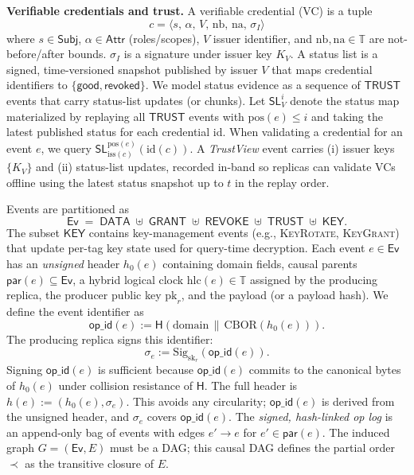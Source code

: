 \documentclass[10pt,journal,compsoc]{IEEEtran}
\begin{document}
\medskip
\noindent\textbf{Verifiable credentials and trust.}
A verifiable credential (VC) is a tuple
\[
  c = \langle s,\, \alpha,\, V,\, \mathrm{nb},\, \mathrm{na},\, \sigma_I\rangle
\]
where $s\!\in\!\mathsf{Subj}$, $\alpha\!\in\!\mathsf{Attr}$ (roles/scopes), $V$ issuer identifier,
and $\mathrm{nb},\mathrm{na}\!\in\!\mathbb{T}$ are not-before/after bounds.
$\sigma_I$ is a signature under issuer key $K_V$.
A status list is a signed, time-versioned snapshot published by issuer $V$ that maps credential identifiers to $\{\mathsf{good},\mathsf{revoked}\}$.
We model status evidence as a sequence of $\mathsf{TRUST}$ events that carry status-list updates (or chunks).
Let $\mathsf{SL}^{i}_{V}$ denote the status map materialized by replaying all $\mathsf{TRUST}$ events with $\mathrm{pos}(e) \le i$ and taking the latest published status for each credential id.
When validating a credential for an event $e$, we query $\mathsf{SL}^{\mathrm{pos}(e)}_{\mathrm{iss}(c)}(\mathrm{id}(c))$.
A \emph{TrustView} event carries (i) issuer keys $\{K_V\}$ and (ii) status-list updates, recorded in-band so replicas can validate VCs offline using the latest status snapshot up to $t$ in the replay order.

\medskip

Events are partitioned as
\[
  \mathsf{Ev} \;=\; \mathsf{DATA}\;\uplus\;\mathsf{GRANT}\;\uplus\;\mathsf{REVOKE}\;\uplus\;\mathsf{TRUST}\;\uplus\;\mathsf{KEY}.
\]
The subset $\mathsf{KEY}$ contains key-management events (e.g., \textsc{KeyRotate}, \textsc{KeyGrant}) that update per-tag key state used for query-time decryption.
Each event $e\in\mathsf{Ev}$ has an \emph{unsigned} header $h_0(e)$ containing domain fields, causal parents $\mathsf{par}(e)\subseteq\mathsf{Ev}$, a hybrid logical clock $\mathrm{hlc}(e)\in\mathbb{T}$ assigned by the producing replica, the producer public key $\mathrm{pk}_r$, and the payload (or a payload hash). We define the event identifier as
\[
  \mathsf{op\_id}(e) := \mathsf{H}(\mathrm{domain}\,\|\,\mathrm{CBOR}(h_0(e))).
\]
The producing replica signs this identifier:
\[
  \sigma_e := \mathrm{Sig}_{\mathrm{sk}_r}(\mathsf{op\_id}(e)).
\]
Signing $\mathsf{op\_id}(e)$ is sufficient because $\mathsf{op\_id}(e)$ commits to the canonical bytes of $h_0(e)$ under collision resistance of $\mathsf{H}$.
The full header is $h(e) := (h_0(e), \sigma_e)$. This avoids any circularity; $\mathsf{op\_id}(e)$ is derived from the unsigned header, and $\sigma_e$ covers $\mathsf{op\_id}(e)$.
The \emph{signed, hash-linked op log} is an append-only bag of events with edges $e'\!\to\! e$ for $e'\in\mathsf{par}(e)$.
The induced graph $G=(\mathsf{Ev},E)$ must be a DAG; this causal DAG defines the partial order $\prec$ as the transitive closure of $E$.
\end{document}
